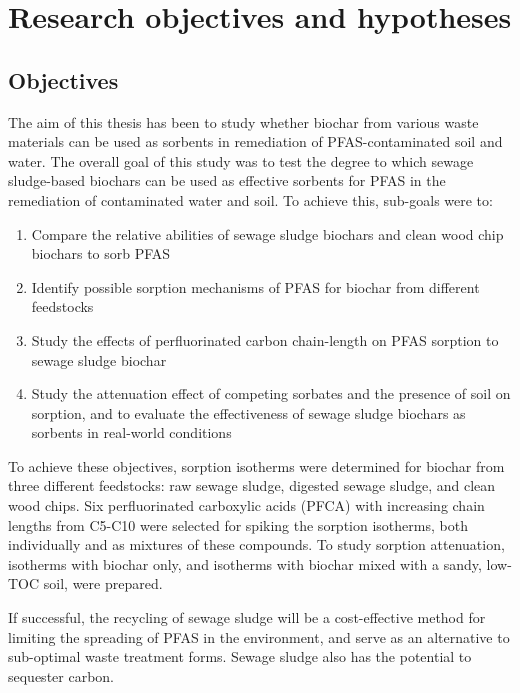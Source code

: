\chapter{Research objectives and hypotheses}\label{chap:Objectives}
\section{Objectives}\label{sec:objectives}
The aim of this thesis has been to study whether biochar from various waste materials can be used as sorbents in remediation of PFAS-contaminated soil and water. The overall goal of this study was to test the degree to which sewage sludge-based biochars can be used as effective sorbents for PFAS in the remediation of contaminated water and soil. To achieve this, sub-goals were to:

\begin{enumerate}[label=\Roman*]
    \item{Compare the relative abilities of sewage sludge biochars and clean wood chip biochars to sorb PFAS}
    \item{Identify possible sorption mechanisms of PFAS for biochar from different feedstocks}
    \item{Study the effects of perfluorinated carbon chain-length on PFAS sorption to sewage sludge biochar}
    \item{Study the attenuation effect of competing sorbates and the presence of soil on sorption, and to evaluate the effectiveness of sewage sludge biochars as sorbents in real-world conditions}
\end{enumerate}

To achieve these objectives, sorption isotherms were determined for biochar from three different feedstocks: raw sewage sludge, digested sewage sludge, and clean wood chips. Six perfluorinated carboxylic acids (PFCA) with increasing chain lengths from C5-C10 were selected for spiking the sorption isotherms, both individually and as mixtures of these compounds. To study sorption attenuation, isotherms with biochar only, and isotherms with biochar mixed with a sandy, low-\acrshort{TOC} soil, were prepared.

If successful, the recycling of sewage sludge will be a cost-effective method for limiting the spreading of PFAS in the environment, and serve as an alternative to sub-optimal waste treatment forms. Sewage sludge also has the potential to sequester carbon.

